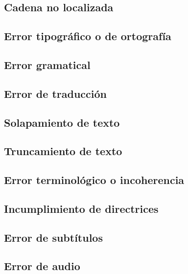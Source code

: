 \subsection{Cadena no localizada}\label{ErrorNoLocalizada}

\subsection{Error tipográfico o de ortografía}\label{ErrorTypo}


\subsection{Error gramatical}\label{ErrorGramatical}


\subsection{Error de traducción}\label{ErrorTraducción}

\subsection{Solapamiento de texto}\label{ErrorSolapamiento}


\subsection{Truncamiento de texto}\label{ErrorTruncamiento}


\subsection{Error terminológico o incoherencia}\label{ErrorTermino}


\subsection{Incumplimiento de directrices}\label{ErrorDirectrices}


\subsection{Error de subtítulos}\label{ErrorSubtitulos}



\subsection{Error de audio}\label{ErrorAudio}



